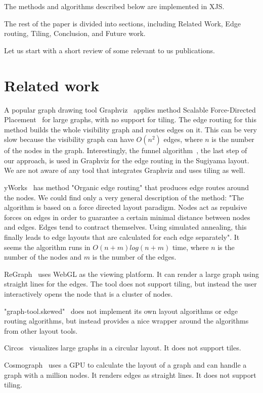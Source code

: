\documentclass{gd-llncs}
\begin{document}
The methods and algorithms described below are implemented in XJS.

The rest of the paper is divided into sections, including Related Work, Edge routing, Tiling, Conclusion, and Future work.

Let us start with a short review of some relevant to us publications.
\section{Related work}\label{relwork}
A popular graph drawing tool Graphviz~\cite{graphviz} applies method
Scalable Force-Directed Placement~\cite{sfdp} for large graphs, with no
support for tiling. The edge routing for this method builds the whole
visibility graph and routes edges on it. This can be very slow because the visibility graph can have $O(n^2)$ edges, where $n$ is the number of the nodes in the graph.
Interestingly, the funnel algorithm~\cite{chazelle1982theorem,hershberger1994computing},
the last step of our approach, is used in Graphviz for the edge routing in the
Sugiyama layout. We are not aware of any tool that integrates Graphviz
and uses tiling as well.

yWorks~\cite{yworks} has method "Organic edge routing" that produces edge
routes around the nodes. We could find only
a very general description of the method: "The algorithm is based on a force
directed layout paradigm. Nodes act as repulsive forces on edges in order to
guarantee a certain minimal distance between nodes and edges. Edges tend to contract
themselves. Using simulated annealing, this finally leads to edge layouts that
are calculated for each edge separately". It seems the algorithm runs in $O(n+m)log(n+m)$
time, where $n$ is the number of the nodes and $m$ is the number of the edges.

ReGraph~\cite{regraph} uses WebGL as the viewing platform. It can render a large
graph using straight lines for the edges. The tool does not support tiling, but instead
the user interactively opens the node that is a cluster of nodes.

"graph-tool.skewed"~\cite{skewed} does not implement its own layout algorithms or
edge routing algorithms, but instead provides a nice wrapper around the algorithms from
other layout tools.

Circos~\cite{circos} visualizes large graphs in a circular layout. It does not support tiles.


Cosmograph~\cite{cosmograph} uses a GPU to calculate the layout of a graph and can
handle a graph with a million nodes. It renders edges as straight lines.
It does not support tiling.
\end{document}
